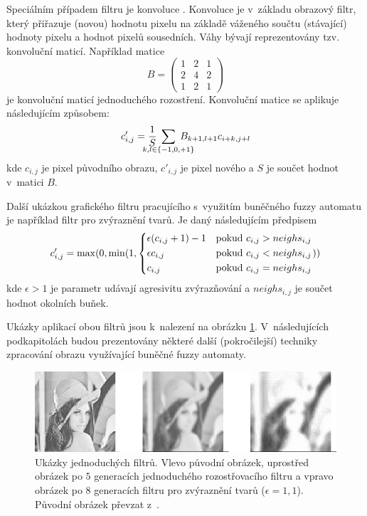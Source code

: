 Speciálním případem filtru je konvoluce \cite{Rus-ImaProHan}. Konvoluce je v~základu obrazový filtr, který přiřazuje (novou) hodnotu pixelu na základě váženého součtu (stávající) hodnoty pixelu a hodnot pixelů sousedních. Váhy bývají reprezentovány tzv. konvoluční maticí. Například matice
$$
  B = \begin{pmatrix}
       1 & 2 & 1 \\
       2 & 4 & 2 \\
       1 & 2 & 1 
      \end{pmatrix}
$$
je konvoluční maticí jednoduchého rozostření. Konvoluční matice se aplikuje následujícím způsobem:
$$
  c'_{i,j} = \frac{1}{S} \; \sum_{\mathclap{k,l \in \{-1, 0, +1\}}} \; B_{k+1, l+1} c_{i+k, j+l}
$$
kde $c_{i,j}$ je pixel původního obrazu, $c'_{i,j}$ je pixel nového a $S$ je součet hodnot v~matici $B$.

Další ukázkou grafického filtru pracujícího s~využitím buněčného fuzzy automatu je například filtr pro zvýraznění tvarů. Je daný následujícím předpisem
$$
  c'_{i,j} = \max(0, \min(1, 
    \begin{dcases}
      \epsilon (c_{i,j} + 1) - 1	& \text{pokud $c_{i,j} > neighs_{i,j}$} \\
      \epsilon c_{i,j}			& \text{pokud $c_{i,j} < neighs_{i,j}$} \\
      c_{i,j}	& \text{pokud $c_{i,j} = neighs_{i,j}$} 
    \end{dcases}
    ))
$$
kde $\epsilon > 1$ je parametr udávají agresivitu zvýrazňování a $neighs_{i,j}$ je součet hodnot okolních buňek.

Ukázky aplikací obou filtrů jsou k~nalezení na obrázku \ref{img:Filters}. V~následujících podkapitolách budou prezentovány některé další (pokročilejší) techniky zpracování obrazu využívající buněčné fuzzy automaty.

\begin{figure}
 \includegraphics[width=\textwidth]{genimg-filters}
 
 \caption[Ukázky jednoduchých filtrů]{Ukázky jednoduchých filtrů. Vlevo původní obrázek, uprostřed obrázek po $5$ generacích jednoduchého rozostřovacího filtru a vpravo obrázek po $8$ generacích filtru pro zvýraznění tvarů ($\epsilon = 1{,}1$). Původní obrázek převzat z~\cite{web-Lenna}.} \label{img:Filters}
\end{figure}


